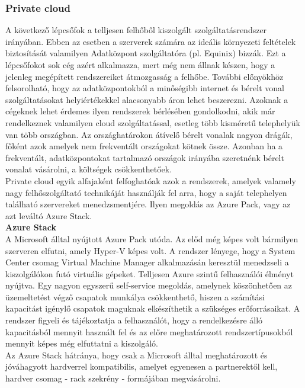 \documentclass[12pt,oneside,justify,table]{book}
\begin{document}
\subsubsection{Private cloud}
A következő lépcsőfok a telljesen felhőből kiszolgált szolgáltatásrendszer irányában. Ebben az esetben a szerverek számára az ideális környezeti feltételek biztosítását valamilyen Adatközpont szolgáltatóra (pl. Equinix) bizzák. Ezt a lépcsőfokot sok cég azért alkalmazza, mert még nem állnak készen, hogy a jelenleg megépített rendszereiket átmozgasság a felhőbe. További előnyökhöz felsorolható, hogy az adatközpontokból a minőségibb internet és bérelt vonal szolgáltatásokat helyiértékekkel alacsonyabb áron lehet beszerezni. Azoknak a cégeknek lehet érdemes ilyen rendszerek bérlésében gondolkodni, akik már rendelkeznek valamilyen cloud szolgáltatással, esetleg több kisméretű telephelyük van több országban. Az országhatárokon átívelő bérelt vonalak nagyon drágák, főként azok amelyek nem frekventált országokat kötnek össze. Azonban ha a frekventált, adatközpontokat tartalmazó országok irányába szeretnénk bérelt vonalat vásárolni, a költségek csökkenthetőek. \\
Private cloud egyik alfajaként felfoghatóak azok a rendszerek, amelyek valamely nagy felhőszolgáltató technikáját használják fel arra, hogy a saját telephelyen található szervereket menedzsmentjére. Ilyen megoldás az Azure Pack, vagy az azt leváltó Azure Stack. \\

\noindent \textbf{Azure Stack} \\
A Microsoft álltal nyújtott Azure Pack utóda. Az előd még képes volt bármilyen szerveren elfutni, amely Hyper-V képes volt. A rendszer lényege, hogy a System Center csomag Virtual Machine Manager  alkalmazásán keresztül menedzseli a kiszolgálókon futó virtuális gépeket. Telljesen Azure szintű felhasználói élményt nyújtva. Egy nagyon egyszerű self-service megoldás, amelynek köszönhetően az üzemeltetést végző csapatok munkálya csökkenthető, hiszen a számítási kapacitást igénylő csapatok maguknak elkészíthetik a szükséges erőforrásaikat. A rendszer figyeli és tájékoztatja a felhasználót, hogy a rendelkezésre álló kapacitásból mennyit használt fel és az előre meghatározott rendszertípusokból mennyit képes még elfuttatni a kiszolgáló. \\
Az Azure Stack hátránya, hogy csak a Microsoft álltal meghatározott és jóváhagyott hardverrel kompatibilis, amelyet egyenesen a partnerektől kell, hardver csomag - rack szekrény - formájában megvásárolni.  
\end{document}
